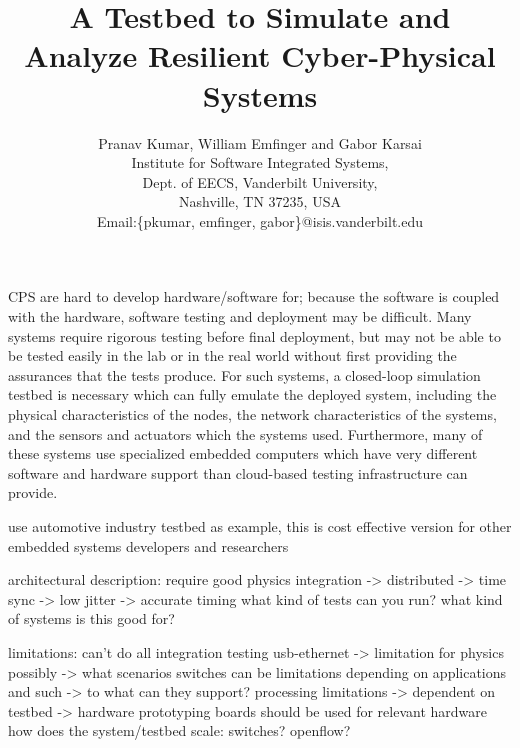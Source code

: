 \documentclass[conference]{IEEEtran}
\begin{document}
%
\title{A Testbed to Simulate and Analyze Resilient Cyber-Physical Systems}


\author{ Pranav Kumar, William Emfinger and Gabor Karsai \\
Institute for Software Integrated Systems,\\ Dept. of EECS, Vanderbilt University,\\
Nashville, TN 37235, USA \\
Email:\{pkumar, emfinger, gabor\}@isis.vanderbilt.edu}


\maketitle




CPS are hard to develop hardware/software for; because the software is coupled with the hardware, software testing and deployment may be difficult.  Many systems require rigorous testing before final deployment, but may not be able to be tested easily in the lab or in the real world without first providing the assurances that the tests produce.  For such systems, a closed-loop simulation testbed is necessary which can fully emulate the deployed system, including the physical characteristics of the nodes, the network characteristics of the systems, and the sensors and actuators which the systems used.  Furthermore, many of these systems use specialized embedded computers which have very different software and hardware support than cloud-based testing infrastructure can provide.  

use automotive industry testbed as example, this is cost effective version for other embedded systems developers and researchers

architectural description:
require good physics integration -> distributed -> time sync -> low jitter -> accurate timing
what kind of tests can you run?
what kind of systems is this good for?

limitations:
can't do all integration testing
usb-ethernet -> limitation for physics possibly -> what scenarios
switches can be limitations depending on applications and such -> to what can they support?
processing limitations -> dependent on testbed -> hardware prototyping boards should be used for relevant hardware
how does the system/testbed scale: switches? openflow?
\end{document}

